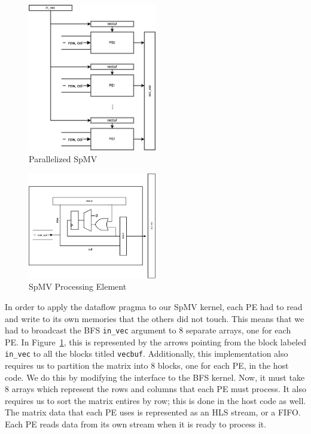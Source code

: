 \documentclass[10pt]{article}
\begin{document}
\begin{figure}[h!]
  \centering
  \includegraphics[width=0.5\textwidth]{spmv_diagram.png}
  \caption{Parallelized SpMV}
  \label{fig:spmv_diagram}
\end{figure}

\begin{figure}[h!]
  \centering
  \includegraphics[width=0.5\textwidth]{pe_diagram.png}
  \caption{SpMV Processing Element}
  \label{fig:pe_diagram}
\end{figure}

\noindent In order to apply the dataflow pragma to our SpMV kernel, each PE had to read and write to its own
memories that the others did not touch. This means that we had to broadcast the BFS \verb|in_vec| argument
to 8 separate arrays, one for each PE. In Figure~\ref{fig:spmv_diagram}, this is represented by the
arrows pointing from the block labeled \verb|in_vec| to all the blocks titled \verb|vecbuf|. Additionally,
this implementation also requires us to partition the matrix into 8 blocks, one for each PE, in the host
code. We do this by modifying the interface to the BFS kernel. Now, it must take 8 arrays which represent
the rows and columns that each PE must process. It also requires us to sort the matrix entires by row;
this is done in the host code as well. The matrix data that each PE uses is represented as an HLS stream,
or a FIFO. Each PE reads data from its own stream when it is ready to process it. \newline
\end{document}

